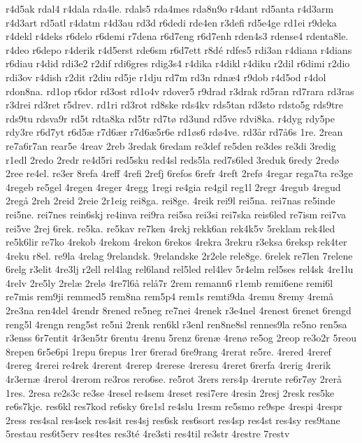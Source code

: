 {r4d5ak
rdal4
r4dala
rda4le.
rdals5
rda4mes
rda8n9o
r4dant
rd5anta
r4d3arm
r4d3art
rd5atl
r4datm
r4d3au
rd3d
r6dedi
rde4en
r3defi
rd5e4ge
rd1ei
r9deka
r4dekl
r4deks
r6delo
r6demi
r7dena
r6d7eng
r6d7enh
rden4s3
rdense4
rdenta8le.
r4deo
r6depo
r4derik
r4d5erst
rde6sm
r6d7ett
r8d^^e9
rdfes5
rdi3an
r4diana
r4dians
r6diau
r4did
rdi3e2
r2dif
rdi6gres
rdig3s4
r4dika
r4dikl
r4diku
r2dil
r6dimi
r2dio
rdi3ov
r4dish
r2dit
r2diu
rd5je
r1dju
rd7m
rd3n
rdn^^e64
r9dob
r4d5od
r4dol
rdon8na.
rd1op
r6dor
rd3ost
rd1o4v
rdover5
r9drad
r3drak
rd5ran
rd7rara
rd3ras
r3drei
rd3ret
r5drev.
rd1ri
rd3rot
rd8ske
rds4kv
rds5tan
rd3sto
rdsto5g
rds9tre
rds9tu
rdsva9r
rd5t
rdta8ka
rd5tr
rd7t^^f8
rd3und
rd5ve
rdvi8ka.
r4dyg
rdy5pe
rdy3re
r6d7yt
r6d5^^e6
r7d6^^e6r
r7d6^^e65r6e
rd1^^f8s6
rd^^f84ve.
rd3^^e5r
rd7^^e56s
1re.
2rean
re7a6r7an
rear5e
4reav
2reb
3redak
6redam
re3def
re5den
re3des
re3di
3redig
r1edl
2redo
2redr
re4d5ri
red5sku
red4sl
reds5la
red7s6led
3reduk
6redy
2red^^f8
2ree
re4el.
re3er
8refa
4reff
4refi
2refj
6refos
6refr
4reft
2ref^^f8
4regar
rega7ta
re3ge
4regeb
re5gel
4regen
4reger
4regg
1regi
re4gia
re4gil
reg1l
2regr
4regub
4regud
2reg^^e5
2reh
2reid
2reie
2r1eig
rei8ga.
rei8ge.
4reik
rei9l
rei5na.
rei7nas
re5inde
rei5ne.
rei7nes
rein6skj
re4inva
rei9ra
rei5sa
rei3si
rei7ska
reis6led
re7ism
rei7va
rei5ve
2rej
6rek.
re5ka.
re5kav
re7ken
4rekj
rekk6an
rek4k5v
5reklam
rek4led
re5k6lir
re7ko
4rekob
4rekom
4rekon
6rekos
4rekra
3rekru
r3eksa
6reksp
rek4ter
4reku
r8el.
re9la
4relag
9relandsk.
9relandske
2r2ele
rele8ge.
6relek
re7len
7relene
6relg
r3elit
4re3lj
r2ell
rel4lag
rel6land
rel5led
rel4lev
5r4elm
rel5ses
rel4sk
4re1lu
4relv
2re5ly
2rel^^e6
2rel^^f8
4re7l6^^e5
rel^^e57r
2rem
remann6
r1emb
remi6ene
remi6l
re7mis
rem9ji
remmed5
rem8na
rem5p4
rem1s
remti9da
4remu
8remy
4rem^^e5
2re3na
ren4del
4rendr
8rened
re5neg
re7nei
4renek
r3e4nel
4renest
6renet
6rengd
reng5l
4rengn
reng5st
re5ni
2renk
ren6kl
r3enl
ren8ne8sl
rennes9la
re5no
ren5sa
r3enss
6r7entit
4r3en5tr
6rentu
4renu
5renz
6ren^^e6
4ren^^f8
re5og
2reop
re3o2r
5reou
8repen
6r5e6pi
1repu
6repus
1rer
6rerad
6re9rang
4rerat
re5re.
4rered
4reref
4rereg
4rerei
re4rek
4rerent
4rerep
4rerese
4reresu
4reret
6rerfa
4rerig
4rerik
4r3ern^^e6
4rerol
4rerom
re3ros
rero6se.
re5rot
3rers
rers4p
4rerute
re6r7^^f8y
2rer^^e5
1res.
2resa
re2s3c
re3se
4resel
re4sem
4reset
resi7ere
4resin
2resj
2resk
res5ke
re6s7kje.
res6kl
res7kod
re6sky
6re1sl
re4slu
1resm
re5smo
re9spe
4respi
4respr
2ress
res4sal
res4sek
res4sit
res4sj
res6sk
res6sort
res4sp
res4st
res4sy
res9tane
5restau
res6t5erv
res4tes
res3t^^e9
4re3sti
res4til
re3str
4restre
7restv
}
